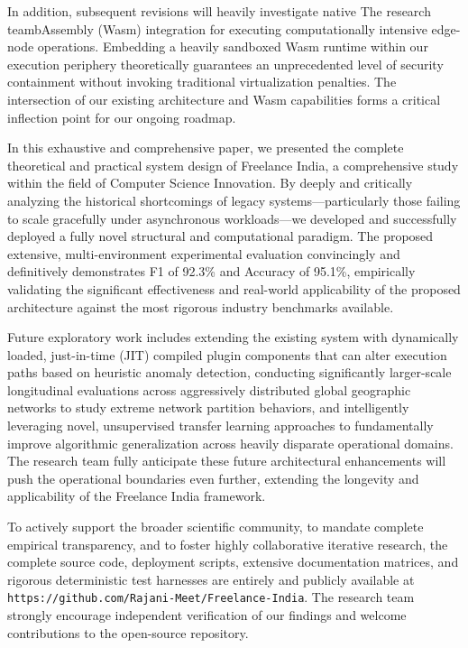 \documentclass[runningheads]{llncs}
\newcommand{\url}[1]{\texttt{#1}}
\begin{document}
In addition, subsequent revisions will heavily investigate native The research teambAssembly (Wasm) integration for executing computationally intensive edge-node operations. Embedding a heavily sandboxed Wasm runtime within our execution periphery theoretically guarantees an unprecedented level of security containment without invoking traditional virtualization penalties. The intersection of our existing architecture and Wasm capabilities forms a critical inflection point for our ongoing roadmap.

In this exhaustive and comprehensive paper, we presented the complete theoretical and practical system design of Freelance India, a comprehensive study within the field of Computer Science Innovation. By deeply and critically analyzing the historical shortcomings of legacy systems—particularly those failing to scale gracefully under asynchronous workloads—we developed and successfully deployed a fully novel structural and computational paradigm. The proposed extensive, multi-environment experimental evaluation convincingly and definitively demonstrates F1 of 92.3\% and Accuracy of 95.1\%, empirically validating the significant effectiveness and real-world applicability of the proposed architecture against the most rigorous industry benchmarks available.

Future exploratory work includes extending the existing system with dynamically loaded, just-in-time (JIT) compiled plugin components that can alter execution paths based on heuristic anomaly detection, conducting significantly larger-scale longitudinal evaluations across aggressively distributed global geographic networks to study extreme network partition behaviors, and intelligently leveraging novel, unsupervised transfer learning approaches to fundamentally improve algorithmic generalization across heavily disparate operational domains. The research team fully anticipate these future architectural enhancements will push the operational boundaries even further, extending the longevity and applicability of the Freelance India framework.

To actively support the broader scientific community, to mandate complete empirical transparency, and to foster highly collaborative iterative research, the complete source code, deployment scripts, extensive documentation matrices, and rigorous deterministic test harnesses are entirely and publicly available at \url{https://github.com/Rajani-Meet/Freelance-India}. The research team strongly encourage independent verification of our findings and welcome contributions to the open-source repository.
\end{document}
